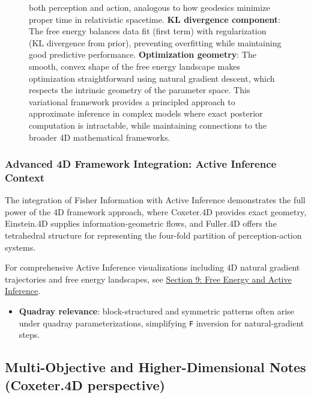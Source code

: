 \documentclass[
  10pt,
]{article}
\newcommand{\passthrough}[1]{#1}
\providecommand{\tightlist}{%
  \setlength{\itemsep}{0pt}\setlength{\parskip}{0pt}}
\begin{document}
\begin{figure}
{both perception and action, analogous to how geodesics minimize proper
time in relativistic spacetime. \textbf{KL divergence component}: The
free energy balances data fit (first term) with regularization (KL
divergence from prior), preventing overfitting while maintaining good
predictive performance. \textbf{Optimization geometry}: The smooth,
convex shape of the free energy landscape makes optimization
straightforward using natural gradient descent, which respects the
intrinsic geometry of the parameter space. This variational framework
provides a principled approach to approximate inference in complex
models where exact posterior computation is intractable, while
maintaining connections to the broader 4D mathematical frameworks.}
\end{figure}

\hypertarget{advanced-4d-framework-integration-active-inference-context}{%
\subsubsection{Advanced 4D Framework Integration: Active Inference
Context}\label{advanced-4d-framework-integration-active-inference-context}}

The integration of Fisher Information with Active Inference demonstrates
the full power of the 4D framework approach, where Coxeter.4D provides
exact geometry, Einstein.4D supplies information-geometric flows, and
Fuller.4D offers the tetrahedral structure for representing the
four-fold partition of perception-action systems.

For comprehensive Active Inference visualizations including 4D natural
gradient trajectories and free energy landscapes, see
\href{09_free_energy_active_inference.md}{Section 9: Free Energy and
Active Inference}.

\begin{itemize}
\tightlist
\item
  \textbf{Quadray relevance}: block-structured and symmetric patterns
  often arise under quadray parameterizations, simplifying
  \passthrough{\lstinline!F!} inversion for natural-gradient steps.
\end{itemize}

\hypertarget{multi-objective-and-higher-dimensional-notes-coxeter.4d-perspective}{%
\subsection{Multi-Objective and Higher-Dimensional Notes (Coxeter.4D
perspective)}\label{multi-objective-and-higher-dimensional-notes-coxeter.4d-perspective}}
\end{document}
